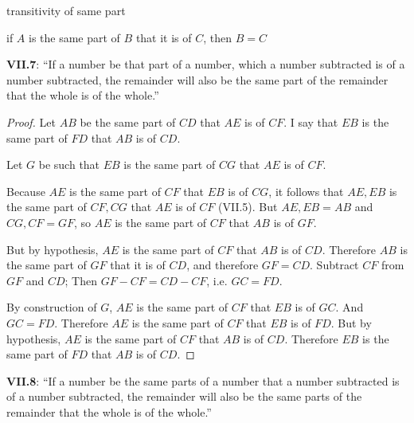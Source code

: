 \documentclass{article}
\begin{document}
transitivity of same part

if $A$ is the same part of $B$ that it is of $C$, then $B=C$

\textbf{VII.7}: ``If a number be that part of a number, which a number subtracted is of a number subtracted, the remainder will also be the same part of the remainder that the whole is of the whole.''

\begin{proof}
Let $AB$ be the same part of $CD$ that $AE$ is of $CF$. 
I say that
$EB$ is the same part of $FD$ that  $AB$ is of $CD$. 

Let $G$ be such that $EB$ is the same part of $CG$ that $AE$ is of $CF$. 

Because $AE$ is the same part of $CF$ that $EB$ is  of $CG$,
it follows that $AE,EB$ is the same part of $CF,CG$ that $AE$ is of $CF$ (VII.5).
But $AE,EB=AB$ and $CG,CF=GF$, so 
$AE$ is the same part of $CF$ that $AB$ is of $GF$.

But by hypothesis, $AE$ is the same part of $CF$  that $AB$ is of $CD$. Therefore $AB$ is the same part
of $GF$ that it is of $CD$, and therefore $GF=CD$. Subtract $CF$ from
$GF$ and $CD$; Then
$GF-CF=CD-CF$, i.e. $GC=FD$. 

By construction of $G$, $AE$ is the same part of $CF$ that $EB$ is of $GC$.
And $GC=FD$. Therefore $AE$ is the same part of $CF$ that $EB$ is of $FD$. 
But by hypothesis, $AE$ is the same part of $CF$ that $AB$ is of $CD$. Therefore
$EB$ is the same part of $FD$ that  $AB$ is of $CD$. 
\end{proof}

\textbf{VII.8}: ``If a number be the same parts of a number that a number subtracted is of a number subtracted, the remainder will also be the same parts of the remainder that the whole is of the whole.''
\end{document}
